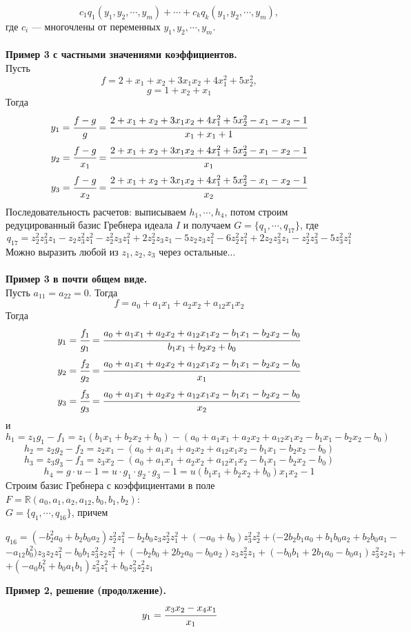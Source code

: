 \documentclass[12pt]{article}
\theoremstyle{definition}
\numberwithin{equation}{section}
\begin{document}
	$$c_1q_1(y_1, y_2, \cdots, y_m)+\cdots+c_kq_k(y_1, y_2, \cdots, y_m),$$
	где $c_i$ --- многочлены от переменных $y_1, y_2, \cdots, y_m$.\\
	\\
	\textbf{Пример 3 с частными значениями коэффициентов.}\\
	Пусть $$f=2+x_1+x_2+3x_1x_2+4x_1^2+5x_2^2,$$
	$$g=1+x_2+x_1$$
	Тогда $$y_1=\cfrac{f-g}{g}=\cfrac{2+x_1+x_2+3x_1x_2+4x_1^2+5x_2^2-x_1-x_2-1}{x_1+x_1+1}$$
	$$y_2=\cfrac{f-g}{x_1}=\cfrac{2+x_1+x_2+3x_1x_2+4x_1^2+5x_2^2-x_1-x_2-1}{x_1}$$
	$$y_3=\cfrac{f-g}{x_2}=\cfrac{2+x_1+x_2+3x_1x_2+4x_1^2+5x_2^2-x_1-x_2-1}{x_2}$$
	Последовательность расчетов: выписываем $h_1, \cdots, h_4$, потом строим редуцированный базис Гребнера идеала $I$ и получаем $G=\{q_1, \cdots, q_{17}\}$, где $$q_{17}=z_2^2z_3^2z_1-z_2z_3^2z_1^2-z_2^2z_3z_1^2+2z_2^2z_3z_1-5z_2z_3z_1^2-6z_2^2z_1^2+2z_2z_3^2z_1-z_2^2z_3^2-5z_3^2z_1^2$$
	Можно выразить любой из $z_1, z_2, z_3$ через остальные...\\
	\\
	\textbf{Пример 3 в почти общем виде.}\\
	Пусть $a_{11}=a_{22}=0$. Тогда
	$$f=a_0+a_1x_1+a_2x_2+a_{12}x_1x_2$$
	Тогда
	$$y_1=\cfrac{f_1}{g_1}=\cfrac{a_0+a_1x_1+a_2x_2+a_{12}x_1x_2-b_1x_1-b_2x_2-b_0}{b_1x_1+b_2x_2+b_0}$$
	$$y_2=\cfrac{f_2}{g_2}=\cfrac{a_0+a_1x_1+a_2x_2+a_{12}x_1x_2-b_1x_1-b_2x_2-b_0}{x_1}$$
	$$y_3=\cfrac{f_3}{g_3}=\cfrac{a_0+a_1x_1+a_2x_2+a_{12}x_1x_2-b_1x_1-b_2x_2-b_0}{x_2}$$
	и $$h_1=z_1g_1-f_1=z_1(b_1x_1+b_2x_2+b_0)-(a_0+a_1x_1+a_2x_2+a_{12}x_1x_2-b_1x_1-b_2x_2-b_0)$$
	$$h_2=z_2g_2-f_2=z_2x_1-(a_0+a_1x_1+a_2x_2+a_{12}x_1x_2-b_1x_1-b_2x_2-b_0)$$
	$$h_3=z_3g_3-f_3=z_3x_2-(a_0+a_1x_1+a_2x_2+a_{12}x_1x_2-b_1x_1-b_2x_2-b_0)$$
	$$h_4=g\cdot u-1=u \cdot g_1\cdot g_2\cdot g_3-1=u(b_1x_1+b_2x_2+b_0)x_1x_2-1$$
	Строим базис Гребнера с коэффициентами в поле $F=\mathbb{R}(a_0, a_1, a_2, a_{12}, b_0, b_1, b_2):$\\$G=\{q_1, \cdots, q_{16}\}$, причем
	\begin{center}
		$q_{16}=(-b_2^2a_0+b_2b_0a_2)z_2^2z_1^2-b_2b_0z_3z_2^2z_1^2+(-a_0+b_0)z_3^2z_2^2+(-2b_2b_1a_0+b_1b_0a_2+b_2b_0a_1-$\\
		$-a_{12}b_0^2)z_3z_2z_1^2-b_0b_1z_3^2z_2z_1^2+(-b_2b_0+2b_2a_0-b_0a_2)z_3z_2^2z_1+(-b_0b_1+2b_1a_0-b_0a_1)z_3^2z_2z_1+$\\
		$+(-a_0b_1^2+b_0a_1b_1)z_3^2z_1^2+b_0z_3^2z_2^2z_1$
	\end{center}
	\textbf{Пример 2, решение (продолжение).}\\
	$$y_1=\cfrac{x_3x_2-x_4x_1}{x_1}$$
\end{document}
